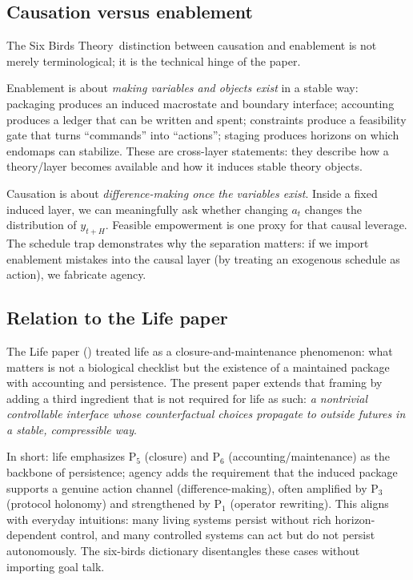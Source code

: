 \documentclass[11pt]{article}
\newcommand{\SBT}{Six Birds Theory}
\begin{document}
\subsection{Causation versus enablement}
The \SBT\ distinction between causation and enablement is not merely terminological; it is the technical hinge of the paper.

Enablement is about \emph{making variables and objects exist} in a stable way: packaging produces an induced macrostate and boundary interface; accounting produces a ledger that can be written and spent; constraints produce a feasibility gate that turns ``commands'' into ``actions''; staging produces horizons on which endomaps can stabilize. These are cross-layer statements: they describe how a theory/layer becomes available and how it induces stable theory objects.

Causation is about \emph{difference-making once the variables exist}. Inside a fixed induced layer, we can meaningfully ask whether changing $a_t$ changes the distribution of $y_{t+H}$. Feasible empowerment is one proxy for that causal leverage. The schedule trap demonstrates why the separation matters: if we import enablement mistakes into the causal layer (by treating an exogenous schedule as action), we fabricate agency.

\subsection{Relation to the Life paper}
The Life paper (\citep{six_birds_life}) treated life as a closure-and-maintenance phenomenon: what matters is not a biological checklist but the existence of a maintained package with accounting and persistence. The present paper extends that framing by adding a third ingredient that is not required for life as such: \emph{a nontrivial controllable interface whose counterfactual choices propagate to outside futures in a stable, compressible way}.

In short: life emphasizes P$_5$ (closure) and P$_6$ (accounting/maintenance) as the backbone of persistence; agency adds the requirement that the induced package supports a genuine action channel (difference-making), often amplified by P$_3$ (protocol holonomy) and strengthened by P$_1$ (operator rewriting). This aligns with everyday intuitions: many living systems persist without rich horizon-dependent control, and many controlled systems can act but do not persist autonomously. The six-birds dictionary disentangles these cases without importing goal talk.
\end{document}
